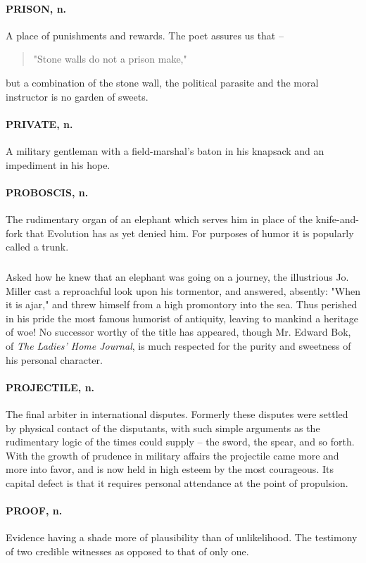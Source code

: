 \documentclass[11pt]{article}
\begin{document}
\paragraph{PRISON, n.}  A place of punishments and rewards.  The poet assures us
that --

\begin{quote}   "Stone walls do not a prison make,"  \end{quote}

but a combination of the stone wall, the political parasite and the
moral instructor is no garden of sweets.

\paragraph{PRIVATE, n.}  A military gentleman with a field-marshal's baton in his
knapsack and an impediment in his hope.

\paragraph{PROBOSCIS, n.}  The rudimentary organ of an elephant which serves him
in place of the knife-and-fork that Evolution has as yet denied him.
For purposes of humor it is popularly called a trunk.
\subparagraph{}   Asked how he knew that an elephant was going on a journey, the
illustrious Jo. Miller cast a reproachful look upon his tormentor, and
answered, absently:  "When it is ajar," and threw himself from a high
promontory into the sea.  Thus perished in his pride the most famous
humorist of antiquity, leaving to mankind a heritage of woe!  No
successor worthy of the title has appeared, though Mr. Edward Bok, of
{\em The Ladies' Home Journal}, is much respected for the purity and
sweetness of his personal character.

\paragraph{PROJECTILE, n.}  The final arbiter in international disputes.  Formerly
these disputes were settled by physical contact of the disputants,
with such simple arguments as the rudimentary logic of the times could
supply -- the sword, the spear, and so forth.  With the growth of
prudence in military affairs the projectile came more and more into
favor, and is now held in high esteem by the most courageous.  Its
capital defect is that it requires personal attendance at the point of
propulsion.

\paragraph{PROOF, n.}  Evidence having a shade more of plausibility than of
unlikelihood.  The testimony of two credible witnesses as opposed to
that of only one.
\end{document}
